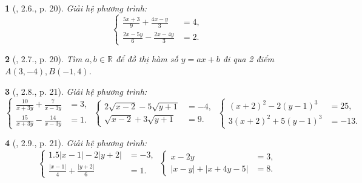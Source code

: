 \documentclass{article}
\newtheorem{baitoan}{}
\begin{document}
\begin{baitoan}[\cite{Binh_boi_duong_Toan_9_tap_2}, 2.6., p. 20]
	Giải hệ phương trình:
	\begin{equation*}
		\left\{\begin{split}
			\frac{5x + 3}{9} + \frac{4x - y}{3} &= 4,\\
			\frac{2x - 5y}{6} - \frac{2x - 4y}{3} &= 2.
		\end{split}\right.
	\end{equation*}
\end{baitoan}

\begin{baitoan}[\cite{Binh_boi_duong_Toan_9_tap_2}, 2.7., p. 20]
	Tìm $a,b\in\mathbb{R}$ để đồ thị hàm số $y = ax + b$ đi qua 2 điểm $A(3,-4),B(-1,4)$.
\end{baitoan}

\begin{baitoan}[\cite{Binh_boi_duong_Toan_9_tap_2}, 2.8., p. 21]
	Giải hệ phương trình:
	\begin{equation*}
		\left\{\begin{split}
			\frac{10}{x + 3y} + \frac{7}{x - 3y} &= 3,\\
			\frac{15}{x + 3y} - \frac{14}{x - 3y} &= 1.
		\end{split}\right.\ 
		\left\{\begin{split}
			2\sqrt{x - 2} - 5\sqrt{y + 1} &= -4,\\
			\sqrt{x - 2} + 3\sqrt{y + 1} &= 9.
		\end{split}\right.\ 
		\left\{\begin{split}
			(x + 2)^2 - 2(y - 1)^3 &= 25,\\
			3(x + 2)^2 + 5(y - 1)^3 &= -13.
		\end{split}\right.
	\end{equation*}
\end{baitoan}

\begin{baitoan}[\cite{Binh_boi_duong_Toan_9_tap_2}, 2.9., p. 21]
	Giải hệ phương trình:
	\begin{equation*}
		\left\{\begin{split}
			1.5|x - 1| - 2|y + 2| &= -3,\\
			\frac{|x - 1|}{4} + \frac{|y + 2|}{6} &= 1.
		\end{split}\right.\ 
		\left\{\begin{split}
			x - 2y &= 3,\\
			|x - y| + |x + 4y - 5| &= 8.
		\end{split}\right.
	\end{equation*}
\end{baitoan}
\end{document}
